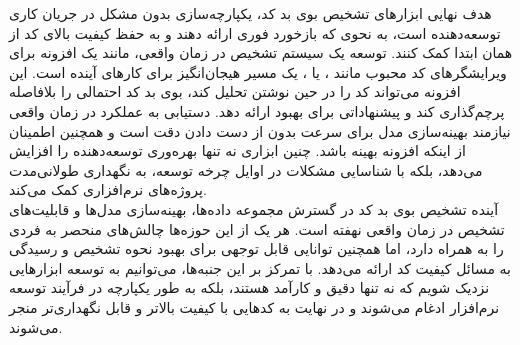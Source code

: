 هدف نهایی ابزارهای تشخیص بوی بد کد، یکپارچه‌سازی بدون مشکل در جریان کاری توسعه‌دهنده است، به نحوی که بازخورد فوری ارائه دهند و به حفظ کیفیت بالای کد از همان ابتدا کمک کنند. توسعه یک سیستم تشخیص در زمان واقعی، مانند یک افزونه برای ویرایشگرهای کد محبوب مانند ،  یا ، یک مسیر هیجان‌انگیز برای کارهای آینده است. این افزونه می‌تواند کد را در حین نوشتن تحلیل کند، بوی بد کد احتمالی را بلافاصله پرچم‌گذاری کند و پیشنهاداتی برای بهبود ارائه دهد. دستیابی به عملکرد در زمان واقعی نیازمند بهینه‌سازی مدل برای سرعت بدون از دست دادن دقت است و همچنین اطمینان از اینکه افزونه بهینه باشد. چنین ابزاری نه تنها بهره‌وری توسعه‌دهنده را افزایش می‌دهد، بلکه با شناسایی مشکلات در اوایل چرخه توسعه، به نگهداری طولانی‌مدت پروژه‌های نرم‌افزاری کمک می‌کند.
\\
آینده تشخیص بوی بد کد در گسترش مجموعه داده‌ها، بهینه‌سازی مدل‌ها و قابلیت‌های تشخیص در زمان واقعی نهفته است. هر یک از این حوزه‌ها چالش‌های منحصر به فردی را به همراه دارد، اما همچنین توانایی قابل توجهی برای بهبود نحوه تشخیص و رسیدگی به مسائل کیفیت کد ارائه می‌دهد. با تمرکز بر این جنبه‌ها، می‌توانیم به توسعه ابزارهایی نزدیک شویم که نه تنها دقیق و کارآمد هستند، بلکه به طور یکپارچه در فرآیند توسعه نرم‌افزار ادغام می‌شوند و در نهایت به کدهایی با کیفیت بالاتر و قابل نگهداری‌تر منجر می‌شوند.
\clearpage
